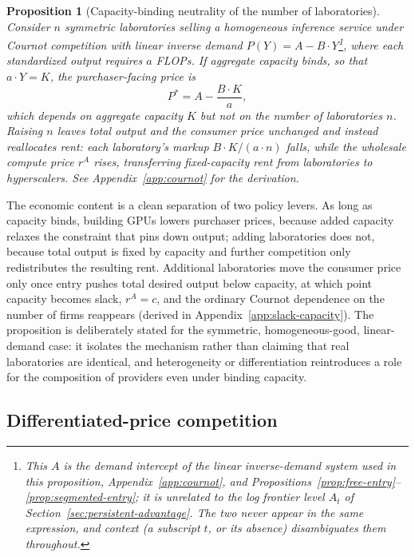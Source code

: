 \documentclass[11pt]{article}
\newtheorem{proposition}{Proposition}
\begin{document}
\begin{proposition}[Capacity-binding neutrality of the number of laboratories]
\label{prop:capacity-neutrality}
Consider $n$ symmetric laboratories selling a homogeneous inference service under Cournot competition with linear inverse demand $P(Y)=A-B\cdot Y$\footnote{This $A$ is the demand intercept of the linear inverse-demand system used in this proposition, Appendix~\ref{app:cournot}, and Propositions~\ref{prop:free-entry}--\ref{prop:segmented-entry}; it is unrelated to the log frontier level $A_t$ of Section~\ref{sec:persistent-advantage}. The two never appear in the same expression, and context (a subscript $t$, or its absence) disambiguates them throughout.}, where each standardized output requires $a$ FLOPs. If aggregate capacity binds, so that $a\cdot Y=K$, the purchaser-facing price is
\begin{equation}P^*=A-\frac{B\cdot K}{a},\end{equation}
which depends on aggregate capacity $K$ but not on the number of laboratories $n$. Raising $n$ leaves total output and the consumer price unchanged and instead reallocates rent: each laboratory's markup $B\cdot K/(a\cdot n)$ falls, while the wholesale compute price $r^A$ rises, transferring fixed-capacity rent from laboratories to hyperscalers. See Appendix~\ref{app:cournot} for the derivation.
\end{proposition}

The economic content is a clean separation of two policy levers. As long as capacity binds, building GPUs lowers purchaser prices, because added capacity relaxes the constraint that pins down output; adding laboratories does not, because total output is fixed by capacity and further competition only redistributes the resulting rent. Additional laboratories move the consumer price only once entry pushes total desired output below capacity, at which point capacity becomes slack, $r^A=c$, and the ordinary Cournot dependence on the number of firms reappears (derived in Appendix~\ref{app:slack-capacity}). The proposition is deliberately stated for the symmetric, homogeneous-good, linear-demand case: it isolates the mechanism rather than claiming that real laboratories are identical, and heterogeneity or differentiation reintroduces a role for the composition of providers even under binding capacity.

\subsection{Differentiated-price competition}
\label{subsec:price-competition}
\end{document}

